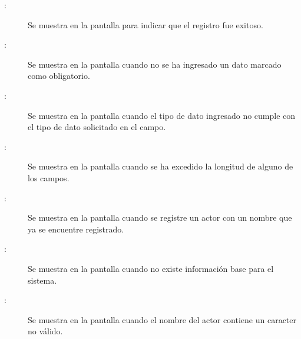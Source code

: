 	
\begin{description}
	\item[:] Se muestra en la pantalla  para indicar que el registro fue exitoso.
	\item[:] Se muestra en la pantalla  cuando no se ha ingresado un dato marcado como obligatorio.
	\item[:] Se muestra en la pantalla  cuando el tipo de dato ingresado no cumple con el tipo de dato solicitado en el campo.
	\item[:] Se muestra en la pantalla  cuando se ha excedido la longitud de alguno de los campos.
	\item[:] Se muestra en la pantalla  cuando se registre un actor con un nombre que ya se encuentre registrado.
	\item[:] Se muestra en la pantalla  cuando no existe información base para el sistema.
	\item[:] Se muestra en la pantalla  cuando el nombre del actor contiene un caracter no válido.
\end{description}
